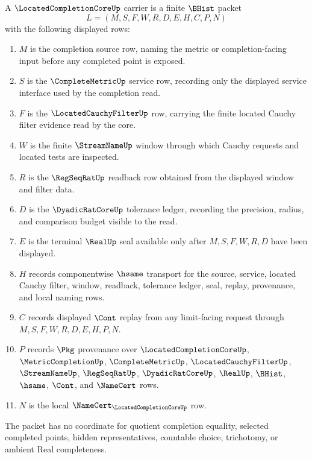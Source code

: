 \begin{definition}
\label{def:located-completion-core-carrier}
A $\LocatedCompletionCoreUp$ carrier is a finite $\BHist$ packet
$$
L=(M,S,F,W,R,D,E,H,C,P,N)
$$
with the following displayed rows:
\begin{enumerate}
\item $M$ is the completion source row, naming the metric or completion-facing input before any completed point is exposed.
\item $S$ is the $\CompleteMetricUp$ service row, recording only the displayed service interface used by the completion read.
\item $F$ is the $\LocatedCauchyFilterUp$ row, carrying the finite located Cauchy filter evidence read by the core.
\item $W$ is the finite $\StreamNameUp$ window through which Cauchy requests and located tests are inspected.
\item $R$ is the $\RegSeqRatUp$ readback row obtained from the displayed window and filter data.
\item $D$ is the $\DyadicRatCoreUp$ tolerance ledger, recording the precision, radius, and comparison budget visible to the read.
\item $E$ is the terminal $\RealUp$ seal available only after $M,S,F,W,R,D$ have been displayed.
\item $H$ records componentwise $\hsame$ transport for the source, service, located Cauchy filter, window, readback, tolerance ledger, seal, replay, provenance, and local naming rows.
\item $C$ records displayed $\Cont$ replay from any limit-facing request through $M,S,F,W,R,D,E,H,P,N$.
\item $P$ records $\Pkg$ provenance over $\LocatedCompletionCoreUp$, $\MetricCompletionUp$, $\CompleteMetricUp$, $\LocatedCauchyFilterUp$, $\StreamNameUp$, $\RegSeqRatUp$, $\DyadicRatCoreUp$, $\RealUp$, $\BHist$, $\hsame$, $\Cont$, and $\NameCert$ rows.
\item $N$ is the local $\NameCert_{\LocatedCompletionCoreUp}$ row.
\end{enumerate}
The packet has no coordinate for quotient completion equality, selected completed points, hidden representatives, countable choice, trichotomy, or ambient Real completeness.
\end{definition}

